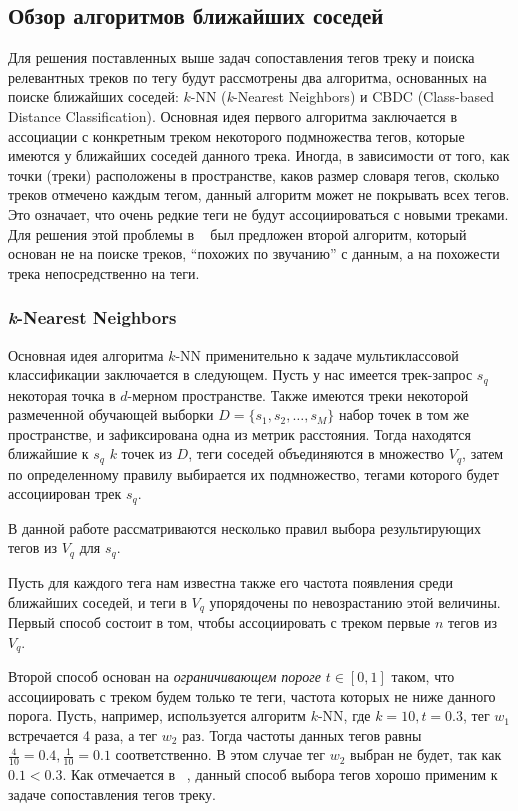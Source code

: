 \subsection{Обзор алгоритмов ближайших соседей}

Для решения поставленных выше задач сопоставления тегов треку и поиска релевантных треков по тегу будут рассмотрены два алгоритма, основанных на поиске ближайших соседей: 
$k$-NN (\emph{k}-Nearest Neighbors) и CBDC (Class-based Distance Classification). Основная идея первого алгоритма заключается в ассоциации с конкретным треком некоторого подмножества тегов, 
которые имеются у ближайших соседей данного трека. Иногда, в зависимости от того, как точки (треки) расположены в пространстве, каков размер словаря тегов, сколько треков отмечено
каждым тегом, данный алгоритм может не покрывать всех тегов. Это означает, что очень редкие теги не будут ассоциироваться с новыми треками. Для решения этой проблемы 
в ~\cite{msordo_thesis} был предложен второй алгоритм, который основан не на поиске треков, ``похожих по звучанию'' с данным, а на похожести трека непосредственно на теги.

\subsubsection{\emph{k}-Nearest Neighbors}

Основная идея алгоритма $k$-NN применительно к задаче мультиклассовой классификации заключается в следующем. Пусть у нас имеется трек-запрос $s_q$ \ld некоторая точка в $d$-мерном пространстве.
Также имеются треки некоторой размеченной обучающей выборки $ D = \{s_1, s_2, \ldots, s_M \}$ \ld набор точек в том же пространстве, и зафиксирована одна из метрик расстояния. 
Тогда находятся ближайшие к $s_q$ $k$ точек из $D$, теги соседей объединяются в множество $V_q$, затем по определенному правилу выбирается их подмножество, тегами которого будет ассоциирован трек $s_q$.

В данной работе рассматриваются несколько правил выбора результирующих тегов из $V_q$ для $s_q$. 

Пусть для каждого тега нам известна также его частота появления среди ближайших соседей, и теги
в $V_q$ упорядочены по невозрастанию этой величины. Первый способ состоит в том, чтобы ассоциировать с треком первые $n$ тегов из $V_q$.

Второй способ основан на \emph{ограничивающем пороге} $t \in [0, 1]$ таком, что ассоциировать с треком будем только те теги, частота которых не ниже данного порога.
Пусть, например, используется алгоритм $k$-NN, где $k = 10, t = 0.3$, тег $w_1$ встречается 4 раза, а тег $w_2$  раз. 
Тогда частоты данных тегов равны $\frac{4}{10} = 0.4, \frac{1}{10} = 0.1$ соответственно. В этом случае тег $w_2$ выбран не будет, так как $0.1 < 0.3$.
Как отмечается в ~\cite{msordo_thesis}, данный способ выбора тегов хорошо применим к задаче сопоставления тегов треку.

